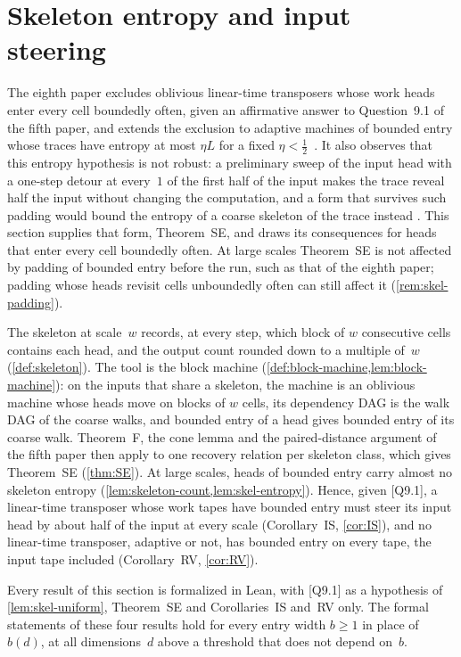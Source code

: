 \section{Skeleton entropy and input steering}\label{sec:skeleton}

The eighth paper excludes oblivious linear-time transposers whose work heads enter every cell boundedly often, given an
affirmative answer to Question~9.1 of the fifth paper, and extends the exclusion to adaptive machines of bounded entry
whose traces have entropy at most $\eta L$ for a fixed $\eta<\frac12$~\cite[Corollaries~6.3
and~6.4]{BoundedNesting2026}. It also observes that this entropy hypothesis is not robust: a preliminary sweep of the
input head with a one-step detour at every~$1$ of the first half of the input makes the trace reveal half the input
without changing the computation, and a form that survives such padding would bound the entropy of a coarse skeleton of
the trace instead \cite[Section~6.2]{BoundedNesting2026}. This section supplies that form, Theorem~SE, and draws its
consequences for heads that enter every cell boundedly often. At large scales Theorem~SE is not affected by padding of
bounded entry before the run, such as that of the eighth paper; padding whose heads revisit cells unboundedly often can
still affect it (\cref{rem:skel-padding}).

The skeleton at scale~$w$ records, at every step, which block of $w$ consecutive cells contains each head, and the
output count rounded down to a multiple of~$w$ (\cref{def:skeleton}). The tool is the block machine
(\cref{def:block-machine,lem:block-machine}): on the inputs that share a skeleton, the machine is an oblivious machine
whose heads move on blocks of $w$ cells, its dependency DAG is the walk DAG of the coarse walks, and bounded entry of a
head gives bounded entry of its coarse walk. Theorem~F, the cone lemma and the paired-distance argument of the fifth
paper then apply to one recovery relation per skeleton class, which gives Theorem~SE (\cref{thm:SE}). At large scales,
heads of bounded entry carry almost no skeleton entropy (\cref{lem:skeleton-count,lem:skel-entropy}). Hence, given
[Q9.1], a linear-time transposer whose work tapes have bounded entry must steer its input head by about half of the
input at every scale (Corollary~IS, \cref{cor:IS}), and no linear-time transposer, adaptive or not, has bounded entry on
every tape, the input tape included (Corollary~RV, \cref{cor:RV}).

Every result of this section is formalized in Lean, with [Q9.1] as a hypothesis of \cref{lem:skel-uniform}, Theorem~SE
and Corollaries~IS and~RV only. The formal statements of these four results hold for every entry width $b\ge1$ in place
of~$b(d)$, at all dimensions~$d$ above a threshold that does not depend on~$b$.

